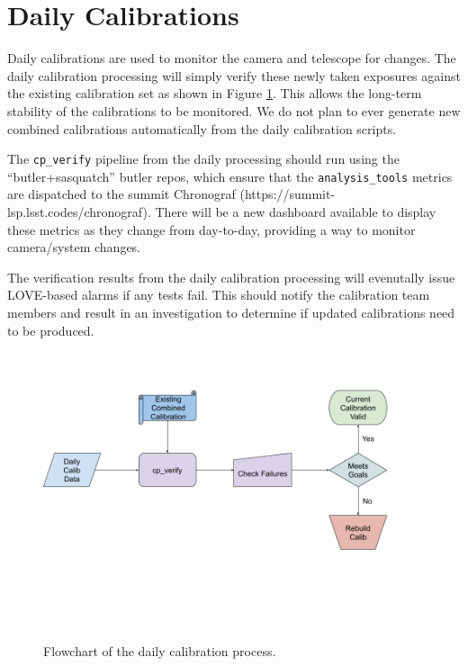 \documentclass[DM,authoryear,toc]{lsstdoc}
\begin{document}
\section{Daily Calibrations}
Daily calibrations are used to monitor the camera and telescope for changes.
The daily calibration processing will simply verify these newly taken exposures against the existing calibration set as shown in Figure \ref{fig:daily}.
This allows the long-term stability of the calibrations to be monitored.
We do not plan to ever generate new combined calibrations automatically from the daily calibration scripts.

The \verb|cp_verify| pipeline from the daily processing should run using the ``butler+sasquatch'' butler repos, which ensure that the \verb|analysis_tools| metrics are dispatched to the summit Chronograf (https://summit-lsp.lsst.codes/chronograf).
There will be a new dashboard available to display these metrics as they change from day-to-day, providing a way to monitor camera/system changes.

The verification results from the daily calibration processing will evenutally issue LOVE-based alarms if any tests fail.
This should notify the calibration team members and result in an investigation to determine if updated calibrations need to be produced.

\begin{figure}
  \includegraphics[width=\linewidth]{figures/daily_processing.png}
  \caption{Flowchart of the daily calibration process.}
  \label{fig:daily}
\end{figure}
\end{document}
